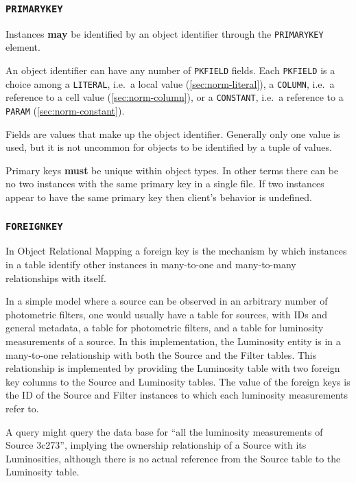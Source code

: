 \documentclass[11pt,a4paper]{ivoa}
\begin{document}
\subsubsection{\texttt{PRIMARYKEY}}\label{sec:norm-primary}

Instances \textbf{may} be identified by an object identifier through the
\texttt{PRIMARYKEY} element.

An object identifier can have any number of \texttt{PKFIELD} fields.
Each \texttt{PKFIELD} is a choice among a \texttt{LITERAL}, i.e.~a local
value (\ref{sec:norm-literal}), a \texttt{COLUMN}, i.e.~a reference to
a cell value (\ref{sec:norm-column}), or a \texttt{CONSTANT}, i.e.~a
reference to a \texttt{PARAM} (\ref{sec:norm-constant}).

Fields are values that make up the object identifier. Generally only one
value is used, but it is not uncommon for objects to be identified by a
tuple of values.

Primary keys \textbf{must} be unique within object types. In other terms
there can be no two instances with the same primary key in a single
file. If two instances appear to have the same primary key then client's
behavior is undefined.

\subsubsection{\texttt{FOREIGNKEY}}\label{sec:norm-foreign}

In Object Relational Mapping a foreign key is the mechanism by which
instances in a table identify other instances in many-to-one and
many-to-many relationships with itself.

In a simple model where a source can be observed in an arbitrary number
of photometric filters, one would usually have a table for sources, with
IDs and general metadata, a table for photometric filters, and a table
for luminosity measurements of a source. In this implementation, the
Luminosity entity is in a many-to-one relationship with both the Source
and the Filter tables. This relationship is implemented by providing the
Luminosity table with two foreign key columns to the Source and
Luminosity tables. The value of the foreign keys is the ID of the Source
and Filter instances to which each luminosity measurements refer to.

A query might query the data base for ``all the luminosity measurements
of Source 3c273'', implying the ownership relationship of a Source with
its Luminosities, although there is no actual reference from the Source
table to the Luminosity table.
\end{document}
